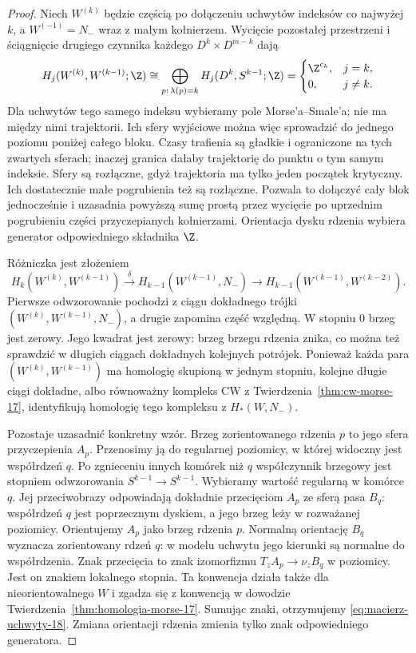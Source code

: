 \begin{proof}
Niech $W^{(k)}$ będzie częścią po dołączeniu
uchwytów indeksów co najwyżej $k$,
a $W^{(-1)}=N_-$ wraz z małym kołnierzem.
Wycięcie pozostałej przestrzeni i
ściągnięcie drugiego czynnika każdego
$D^k\times D^{m-k}$ dają
\[
 H_j(W^{(k)},W^{(k-1)};\Z)
 \cong
 \bigoplus_{p:\,\lambda(p)=k}
 H_j(D^k,S^{k-1};\Z)
 =
 \begin{cases}
 \Z^{c_k},&j=k,\\
 0,&j\ne k.
 \end{cases}
\]
Dla uchwytów tego samego indeksu wybieramy pole
Morse'a--Smale'a; nie ma między nimi trajektorii.
Ich sfery wyjściowe można więc sprowadzić do jednego
poziomu poniżej całego bloku. Czasy trafienia są
gładkie i ograniczone na tych zwartych sferach;
inaczej granica dałaby trajektorię do punktu
o tym samym indeksie. Sfery są rozłączne, gdyż
trajektoria ma tylko jeden początek krytyczny.
Ich dostatecznie małe pogrubienia też są rozłączne.
Pozwala to dołączyć cały blok jednocześnie
i uzasadnia powyższą sumę prostą przez wycięcie
po uprzednim pogrubieniu części przyczepianych kołnierzami.
Orientacja dysku rdzenia wybiera generator
odpowiedniego składnika $\Z$.

Różniczka jest złożeniem
\[
 H_k(W^{(k)},W^{(k-1)})
 \xrightarrow{\delta}H_{k-1}(W^{(k-1)},N_-)
 \longrightarrow H_{k-1}(W^{(k-1)},W^{(k-2)}).
\]
Pierwsze odwzorowanie pochodzi z ciągu dokładnego trójki
$(W^{(k)},W^{(k-1)},N_-)$, a drugie zapomina
część względną. W stopniu $0$ brzeg jest zerowy.
Jego kwadrat jest zerowy: brzeg brzegu
rdzenia znika, co można też sprawdzić
w długich ciągach dokładnych kolejnych
potrójek. Ponieważ każda para
$(W^{(k)},W^{(k-1)})$ ma homologię
skupioną w jednym stopniu, kolejne
długie ciągi dokładne, albo równoważny
kompleks CW z
Twierdzenia~\ref{thm:cw-morse-17},
identyfikują homologię tego kompleksu
z $H_*(W,N_-)$.

Pozostaje uzasadnić konkretny wzór.
Brzeg zorientowanego rdzenia $p$
to jego sfera przyczepienia $A_p$.
Przenosimy ją do regularnej poziomicy,
w której widoczny jest współrdzeń $q$.
Po zgnieceniu innych komórek niż $q$
współczynnik brzegowy jest stopniem
odwzorowania
$S^{k-1}\to S^{k-1}$.
Wybieramy wartość regularną w komórce $q$.
Jej przeciwobrazy odpowiadają dokładnie
przecięciom $A_p$ ze sferą pasa $B_q$:
współrdzeń $q$ jest poprzecznym dyskiem,
a jego brzeg leży w rozważanej poziomicy.
Orientujemy $A_p$ jako brzeg rdzenia $p$.
Normalną orientację $B_q$ wyznacza zorientowany
rdzeń $q$: w modelu uchwytu jego kierunki są
normalne do współrdzenia. Znak przecięcia to znak
izomorfizmu $T_zA_p\to\nu_z B_q$ w poziomicy.
Jest on znakiem lokalnego stopnia. Ta konwencja
działa także dla nieorientowalnego $W$ i zgadza się
z konwencją w dowodzie
Twierdzenia~\ref{thm:homologia-morse-17}.
Sumując znaki, otrzymujemy
\eqref{eq:macierz-uchwyty-18}.
Zmiana orientacji rdzenia zmienia tylko
znak odpowiedniego generatora.
\end{proof}


